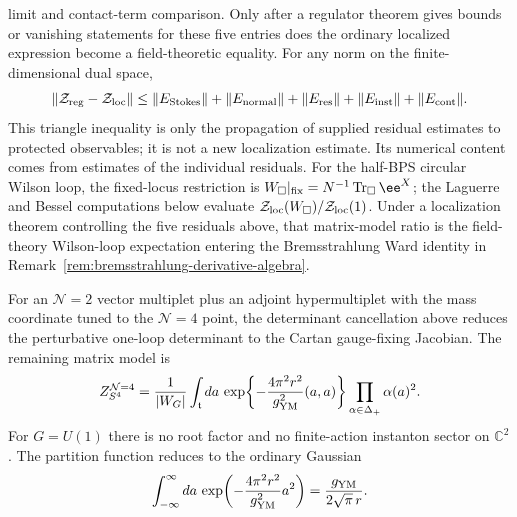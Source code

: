 limit and contact-term comparison.  Only after a regulator theorem gives
bounds or vanishing statements for these five entries does the ordinary
localized expression become a field-theoretic equality.  For any norm on the
finite-dimensional dual space,
\[
  \left\|\mathcal Z_{\rm reg}-\mathcal Z_{\rm loc}\right\|
  \le
  \|E_{\rm Stokes}\|+\|E_{\rm normal}\|+\|E_{\rm res}\|
  +\|E_{\rm inst}\|+\|E_{\rm cont}\|.
\]
This triangle inequality is only the propagation of supplied residual
estimates to protected observables; it is not a new localization estimate.
Its numerical content comes from estimates of the individual residuals.  For
the half-BPS circular Wilson loop, the fixed-locus restriction is
\(W_{\square}|_{\rm fix}=N^{-1}\operatorname{Tr}_{\square}\ee^X\); the
Laguerre and Bessel computations below evaluate
\(\mathcal Z_{\rm loc}(W_{\square})/\mathcal Z_{\rm loc}(1)\).  Under a
localization theorem controlling the five residuals above, that matrix-model
ratio is the field-theory Wilson-loop expectation entering the Bremsstrahlung
Ward identity in Remark~\ref{rem:bremsstrahlung-derivative-algebra}.

\begin{example}[\(\mathcal N=4\) Yang--Mills degeneration]
\label{ex:s4-n4-gaussian-matrix-model}
For an \(\mathcal N=2\) vector multiplet plus an adjoint hypermultiplet with
the mass coordinate tuned to the \(\mathcal N=4\) point,
the determinant cancellation above reduces the
perturbative one-loop determinant to the Cartan gauge-fixing Jacobian.  The
remaining matrix model is
\[
  Z_{S^4}^{\mathcal N=4}
  =
  \frac1{|W_G|}
  \int_{\mathfrak t}da\,
  \exp\!\left\{
    -\frac{4\pi^2r^2}{g_{\rm YM}^2}(a,a)
  \right\}
  \prod_{\alpha\in\Delta_+}\alpha(a)^2 .
\]
For \(G=U(1)\) there is no root factor and no finite-action instanton sector
on \(\mathbb C^2\).  The partition function reduces to the ordinary Gaussian
\begin{equation}
  \int_{-\infty}^{\infty} da\,
  \exp\!\left(-\frac{4\pi^2r^2}{g_{\rm YM}^2}a^2\right)
  =
  \frac{g_{\rm YM}}{2\sqrt{\pi}\,r}.
  \label{eq:s4-u1-gaussian-localization}
\end{equation}
\end{example}


